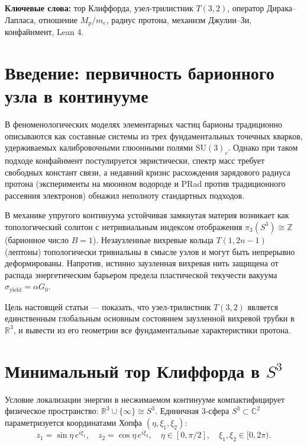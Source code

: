 \documentclass[11pt,a4paper]{article}
\theoremstyle{definition}
\theoremstyle{remark}
\begin{document}
\vspace{2mm}
\noindent\textbf{Ключевые слова:} тор Клиффорда, узел-трилистник $T(3,2)$, оператор Дирака--Лапласа, отношение $M_p/m_e$, радиус протона, механизм Джулии--Зи, конфайнмент, Lean 4.

\section{Введение: первичность барионного узла в континууме}
В феноменологических моделях элементарных частиц барионы традиционно описываются как составные системы из трех фундаментальных точечных кварков, удерживаемых калибровочными глюонными полями $\mathrm{SU}(3)_c$. Однако при таком подходе конфайнмент постулируется эвристически, спектр масс требует свободных констант связи, а недавний кризис расхождения зарядового радиуса протона (эксперименты на мюонном водороде и PRad против традиционного рассеяния электронов) обнажил неполноту стандартных подходов.

В механике упругого континуума устойчивая замкнутая материя возникает как топологический солитон с нетривиальным индексом отображения $\pi_3(S^3) \cong \mathbb{Z}$ (барионное число $B=1$). Незаузленные вихревые кольца $T(1, 2n-1)$ (лептоны) топологически тривиальны в смысле узлов и могут быть непрерывно деформированы. Напротив, истинно заузленная вихревая нить защищена от распада энергетическим барьером предела пластической текучести вакуума $\sigma_{\mathrm{yield}} = \alpha G_0$.

Цель настоящей статьи — показать, что узел-трилистник $T(3,2)$ является единственным глобальным основным состоянием заузленной вихревой трубки в $\mathbb{R}^3$, и вывести из его геометрии все фундаментальные характеристики протона.

\section{Минимальный тор Клиффорда в $S^3$}
Условие локализации энергии в несжимаемом континууме компактифицирует физическое пространство: $\mathbb{R}^3 \cup \{\infty\} \cong S^3$. Единичная 3-сфера $S^3 \subset \mathbb{C}^2$ параметризуется координатами Хопфа $(\eta, \xi_1, \xi_2)$:
\begin{equation}
    z_1 = \sin\eta \, e^{i\xi_1}, \quad z_2 = \cos\eta \, e^{i\xi_2}, \quad \eta \in [0, \pi/2], \quad \xi_1, \xi_2 \in [0, 2\pi).
\end{equation}
\end{document}
